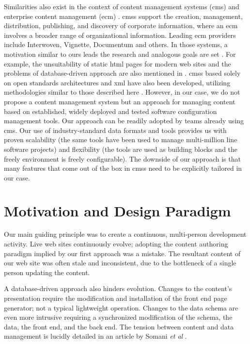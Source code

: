 \documentclass{elsart}
\begin{document}
Similarities also exist in the context of content management systems ({\sc cms}) \cite{SET02,MT04}
and enterprise content management ({\sc ecm}) \cite{NP04}.
{\sc cms}s support the creation, management, distribution, publishing, and discovery of corporate information, where an {\sc ecm} 
involves a broader range of organizational information. Leading {\sc ecm} providers include Interwoven, 
Vignette, Documentum and others. In those systems, a motivation similar to ours 
leads the research and analogous goals are set \cite{KW05,DOC05}. For example, the unsuitability of static {\sc html} pages for modern 
web sites and the problems of database-driven approach are also mentioned in \cite{KW05}. 
{\sc cms}s based solely on open standards architectures and
{\sc xml} have also been developed,
utilizing methodologies similar to those described here \cite{XYW02,OS05}.
However, in our case,
we do not propose a content management system but an approach for managing content based on established, widely deployed 
and tested software configuration management tools. Our approach can be readily adopted by teams already using {\sc cms}. 
Our use of industry-standard data formats and tools provides us with proven scalability (the same tools have been used 
to manage multi-million line software projects) and flexibility (the tools are used as building blocks and the
freely environment is freely configurable).
The downside of our approach is that many features that come out of the box in {\sc cms}s need 
to be explicitly tailored in our case.

\section{Motivation and Design Paradigm}
\label{sec:design}

Our main guiding principle was to create a continuous, multi-person development activity.
Live web sites continuously evolve;
adopting the content authoring paradigm implied
by our first approach was a mistake.
The resultant content of our web site was often stale and inconsistent,
due to the bottleneck of a single person updating the content.

A database-driven approach also hinders evolution.
Changes to the content's presentation require the modification
and installation of the front end page generator;
not a typical lightweight operation.
Changes to the data schema are even more intrusive
requiring a synchronized modification of the schema,
the data, the front end, and the back end.
The tension between content and data management is lucidly
detailed in an article by Somani {\em et al} \cite{SCK02}.
\end{document}
